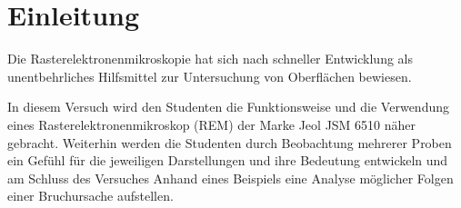 
\chapter{Einleitung}
\label{chap:einleitung}

Die Rasterelektronenmikroskopie hat sich nach schneller Entwicklung als unentbehrliches Hilfsmittel zur Untersuchung von Oberflächen bewiesen. 

In diesem Versuch wird den Studenten die Funktionsweise und die Verwendung eines Rasterelektronenmikroskop (REM) der Marke Jeol JSM 6510 näher gebracht. Weiterhin werden die Studenten durch Beobachtung mehrerer Proben ein Gefühl für die jeweiligen Darstellungen und ihre Bedeutung entwickeln und am Schluss des Versuches Anhand eines Beispiels eine Analyse möglicher Folgen einer Bruchursache aufstellen.
